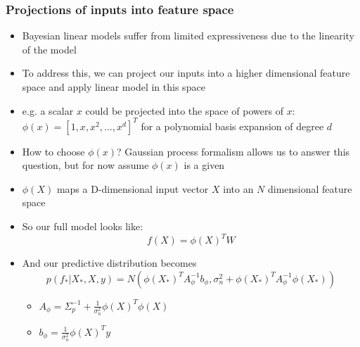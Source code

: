 \documentclass[12pt]{article}
\begin{document}
\subsubsection{Projections of inputs into feature space}
\begin{itemize}
    \item Bayesian linear models suffer from limited expressiveness due to the linearity of the model
    \item To address this, we can project our inputs into a higher dimensional feature space and apply linear model in this space
    \item e.g. a scalar $x$ could be projected into the space of powers of $x$: $\phi(x) = [1, x, x^2, \ldots, x^d]^T$ for a polynomial basis expansion of degree $d$
    \item How to choose $\phi(x)$? Gaussian process formalism allows us to answer this question, but for now assume $\phi(x)$ is a given
    \item $\phi(X)$ maps a D-dimensional input vector $X$ into an $N$ dimensional feature space
    \item So our full model looks like:
\begin{equation}
    f(X) = \phi(X)^T W
\end{equation}
    \item And our predictive distribution becomes
\begin{equation}
    p(f_*|X_*,X,y) = N(\phi(X_*)^TA_{\phi}^{-1}b_{\phi} , \sigma_n^2 + \phi(X_*)^TA_{\phi}^{-1}\phi(X_*))
\end{equation}
    \begin{itemize}
        \item $A_{\phi} = \Sigma_p^{-1} + \frac{1}{\sigma^2_n}\phi(X)^T\phi(X)$
        \item $b_{\phi} = \frac{1}{\sigma^2_n}\phi(X)^Ty$
    \end{itemize}
\end{itemize}
\end{document}
